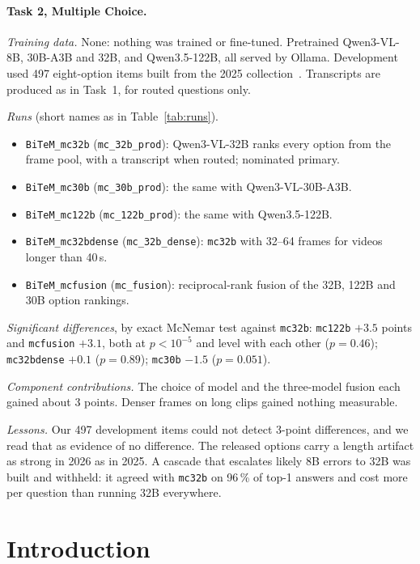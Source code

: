 \documentclass[sigconf,nonacm]{acmart}
\begin{document}
\paragraph{Task 2, Multiple Choice.}
\emph{Training data.} None: nothing was trained or fine-tuned. Pretrained
Qwen3-VL-8B, 30B-A3B and 32B, and Qwen3.5-122B, all served by Ollama. Development
used 497 eight-option items built from the 2025 collection~\cite{awad2025vqa}.
Transcripts are produced as in Task~1, for routed questions only.

\emph{Runs} (short names as in Table~\ref{tab:runs}).
\begin{itemize}\setlength{\itemsep}{1pt}
\item \texttt{BiTeM\_mc32b} (\texttt{mc\_32b\_prod}): Qwen3-VL-32B ranks every
option from the frame pool, with a transcript when routed; nominated primary.
\item \texttt{BiTeM\_mc30b} (\texttt{mc\_30b\_prod}): the same with
Qwen3-VL-30B-A3B.
\item \texttt{BiTeM\_mc122b} (\texttt{mc\_122b\_prod}): the same with
Qwen3.5-122B.
\item \texttt{BiTeM\_mc32bdense} (\texttt{mc\_32b\_dense}): \texttt{mc32b} with
32--64 frames for videos longer than 40\,s.
\item \texttt{BiTeM\_mcfusion} (\texttt{mc\_fusion}): reciprocal-rank fusion of the
32B, 122B and 30B option rankings.
\end{itemize}

\emph{Significant differences}, by exact McNemar test against \texttt{mc32b}:
\texttt{mc122b} $+3.5$ points and \texttt{mcfusion} $+3.1$, both at
$p<10^{-5}$ and level with each other ($p=0.46$); \texttt{mc32bdense} $+0.1$
($p=0.89$); \texttt{mc30b} $-1.5$ ($p=0.051$).

\emph{Component contributions.} The choice of model and the three-model fusion
each gained about 3 points. Denser frames on long clips gained nothing
measurable.

\emph{Lessons.} Our 497 development items could not detect 3-point differences,
and we read that as evidence of no difference. The released options carry a
length artifact as strong in 2026 as in 2025. A cascade that escalates likely 8B
errors to 32B was built and withheld: it agreed with \texttt{mc32b} on 96\,\% of
top-1 answers and cost more per question than running 32B everywhere.

\section{Introduction}
\end{document}
